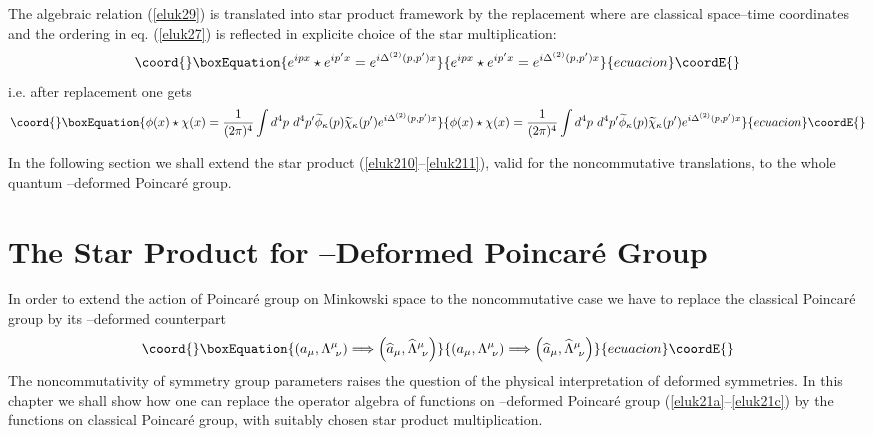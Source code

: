 \documentclass[a4paper,12pt]{article}
\begin{document}
The algebraic relation (\ref{eluk29}) is translated into star
product framework by the replacement \coordHE{} where \coordHE{} are classical  space--time coordinates 
and the ordering in eq.  (\ref{eluk27}) is reflected in explicite
choice of the  star multiplication:
\begin{equation}\coord{}\boxEquation{\label{eluk210}
  e^{ipx} \star e^{ip^{\prime}x} =
e^{i\Delta^{(2)}(p,p^{\prime}){x}}
}{e^{ipx} \star e^{ip^{\prime}x} =
e^{i\Delta^{(2)}(p,p^{\prime}){x}}
}{ecuacion}\coordE{}\end{equation}
i.e. after replacement \coordHE{} one gets
\begin{equation}\coord{}\boxEquation{\label{eluk211}
  \phi(x) \star \chi(x) =
  {1\over (2\pi)^{4}} \int d^{4} p \ d^{4}p^{\prime}
  \widetilde{\phi}_{\kappa}(p)
  \widetilde{\chi}_{\kappa}(p^{\prime})
e^{i\Delta^{(2)}(p,p^{\prime}){x}}
}{\phi(x) \star \chi(x) =
  {1\over (2\pi)^{4}} \int d^{4} p \ d^{4}p^{\prime}
  \widetilde{\phi}_{\kappa}(p)
  \widetilde{\chi}_{\kappa}(p^{\prime})
e^{i\Delta^{(2)}(p,p^{\prime}){x}}
}{ecuacion}\coordE{}\end{equation}

In the following section we shall extend the star product
(\ref{eluk210}--\ref{eluk211}), valid for the noncommutative
translations, to the whole quantum \myHighlight{$\kappa$}\coordHE{}--deformed Poincar\'{e}
group.

\section{The Star Product for \myHighlight{$\kappa$}\coordHE{}--Deformed Poincar\'{e}
Group}


In order to extend the action of Poincar\'{e}  group on Minkowski 
space
 to the noncommutative case we 
have to replace the classical Poincar\'{e} group
 by its \myHighlight{$\kappa$}\coordHE{}--deformed counterpart
\begin{equation}\coord{}\boxEquation{\label{eluk31}
  \left(a_{\mu}, \Lambda^{\mu}_{\ \nu} \right) \Longrightarrow
  \left(\widehat{a}_{\mu}, \widehat{\Lambda}^{\mu}_{\ \nu} \right)
}{\left(a_{\mu}, \Lambda^{\mu}_{\ \nu} \right) \Longrightarrow
  \left(\widehat{a}_{\mu}, \widehat{\Lambda}^{\mu}_{\ \nu} \right)
}{ecuacion}\coordE{}\end{equation}
The noncommutativity of symmetry group parameters raises the
question of the physical interpretation of deformed symmetries. In
this chapter we shall show how one can replace  the operator
algebra of functions on \myHighlight{$\kappa$}\coordHE{}--deformed Poincar\'{e} group
 (\ref{eluk21a}--\ref{eluk21c}) by the functions on classical
  Poincar\'{e} group, with suitably chosen star product
  multiplication.
\end{document}
